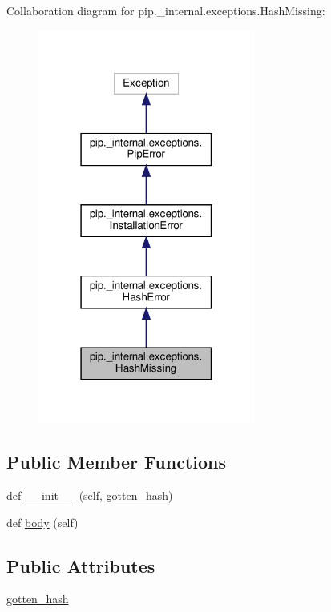 Collaboration diagram for pip.\+\_\+internal.\+exceptions.\+Hash\+Missing\+:
\nopagebreak
\begin{figure}[H]
\begin{center}
\leavevmode
\includegraphics[width=202pt]{classpip_1_1__internal_1_1exceptions_1_1HashMissing__coll__graph}
\end{center}
\end{figure}
\subsection*{Public Member Functions}
\begin{DoxyCompactItemize}
\item 
def \hyperlink{classpip_1_1__internal_1_1exceptions_1_1HashMissing_a0ee6dcf494bd4022600aabde35ddd29f}{\+\_\+\+\_\+init\+\_\+\+\_\+} (self, \hyperlink{classpip_1_1__internal_1_1exceptions_1_1HashMissing_ac0609ac6fee8ef5fc670a982f6a6eeaa}{gotten\+\_\+hash})
\item 
def \hyperlink{classpip_1_1__internal_1_1exceptions_1_1HashMissing_ac0e1ecc6b10c6d140adc7b1e3d4d3f78}{body} (self)
\end{DoxyCompactItemize}
\subsection*{Public Attributes}
\begin{DoxyCompactItemize}
\item 
\hyperlink{classpip_1_1__internal_1_1exceptions_1_1HashMissing_ac0609ac6fee8ef5fc670a982f6a6eeaa}{gotten\+\_\+hash}
\end{DoxyCompactItemize}
